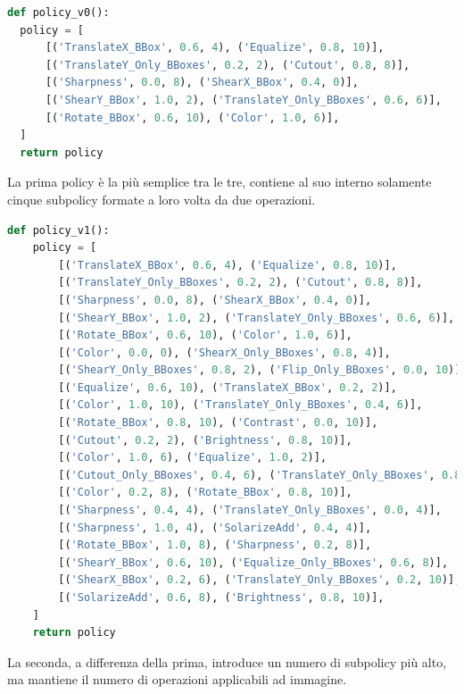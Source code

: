 \begin{lstlisting}[caption={Policy V0 di AutoAugment}, language=Python, basicstyle=\tiny,label=code:policy_v0]
def policy_v0():
  policy = [
      [('TranslateX_BBox', 0.6, 4), ('Equalize', 0.8, 10)],
      [('TranslateY_Only_BBoxes', 0.2, 2), ('Cutout', 0.8, 8)],
      [('Sharpness', 0.0, 8), ('ShearX_BBox', 0.4, 0)],
      [('ShearY_BBox', 1.0, 2), ('TranslateY_Only_BBoxes', 0.6, 6)],
      [('Rotate_BBox', 0.6, 10), ('Color', 1.0, 6)],
  ]
  return policy
\end{lstlisting}
La prima policy è la più semplice tra le tre, contiene al suo interno solamente cinque subpolicy formate a loro volta da due operazioni.
\begin{lstlisting}[caption={Policy V1 di AutoAugment}, language=Python, basicstyle=\tiny,label=code:policy_v1]
def policy_v1():
    policy = [
        [('TranslateX_BBox', 0.6, 4), ('Equalize', 0.8, 10)],
        [('TranslateY_Only_BBoxes', 0.2, 2), ('Cutout', 0.8, 8)],
        [('Sharpness', 0.0, 8), ('ShearX_BBox', 0.4, 0)],
        [('ShearY_BBox', 1.0, 2), ('TranslateY_Only_BBoxes', 0.6, 6)],
        [('Rotate_BBox', 0.6, 10), ('Color', 1.0, 6)],
        [('Color', 0.0, 0), ('ShearX_Only_BBoxes', 0.8, 4)],
        [('ShearY_Only_BBoxes', 0.8, 2), ('Flip_Only_BBoxes', 0.0, 10)],
        [('Equalize', 0.6, 10), ('TranslateX_BBox', 0.2, 2)],
        [('Color', 1.0, 10), ('TranslateY_Only_BBoxes', 0.4, 6)],
        [('Rotate_BBox', 0.8, 10), ('Contrast', 0.0, 10)],
        [('Cutout', 0.2, 2), ('Brightness', 0.8, 10)],
        [('Color', 1.0, 6), ('Equalize', 1.0, 2)],
        [('Cutout_Only_BBoxes', 0.4, 6), ('TranslateY_Only_BBoxes', 0.8, 2)],
        [('Color', 0.2, 8), ('Rotate_BBox', 0.8, 10)],
        [('Sharpness', 0.4, 4), ('TranslateY_Only_BBoxes', 0.0, 4)],
        [('Sharpness', 1.0, 4), ('SolarizeAdd', 0.4, 4)],
        [('Rotate_BBox', 1.0, 8), ('Sharpness', 0.2, 8)],
        [('ShearY_BBox', 0.6, 10), ('Equalize_Only_BBoxes', 0.6, 8)],
        [('ShearX_BBox', 0.2, 6), ('TranslateY_Only_BBoxes', 0.2, 10)],
        [('SolarizeAdd', 0.6, 8), ('Brightness', 0.8, 10)],
    ]
    return policy
\end{lstlisting}
La seconda, a differenza della prima, introduce un numero di subpolicy più alto, ma mantiene il numero di operazioni applicabili ad immagine. 

